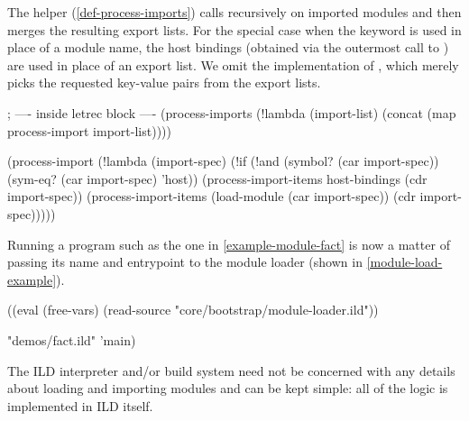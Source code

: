 \label{def-eval-module}
The  helper (\cref{def-process-imports}) calls  recursively on
imported modules and then merges the resulting export lists. For the special
case when the  keyword is used in place of a module name,
the host bindings (obtained via the outermost call to ) are
used in place of an export list.
We omit the implementation of , which merely
picks the requested key-value pairs from the export lists.
\begin{listingbox}\begin{ildcode}
; ---- inside letrec block ----
(process-imports (!lambda (import-list)
  (concat (map process-import import-list))))

(process-import (!lambda (import-spec)
  (!if (!and (symbol? (car import-spec))
             (sym-eq? (car import-spec) 'host))
    (process-import-items
      host-bindings
      (cdr import-spec))
    (process-import-items
      (load-module (car import-spec))
      (cdr import-spec)))))
\end{ildcode}\end{listingbox}
\label{def-process-imports}
Running a program
such as the one in \cref{example-module-fact} is now a matter of passing its
name and entrypoint to the module loader (shown in \cref{module-load-example}).
\begin{listingbox}\begin{ildcode}
((eval (free-vars) (read-source
  "core/bootstrap/module-loader.ild"))

  "demos/fact.ild"
  'main)
\end{ildcode}\end{listingbox}
\label{module-load-example}
The ILD interpreter and/or build system need not be concerned with any details
about loading and importing modules and can be kept simple: all of the logic
is implemented in ILD itself.
